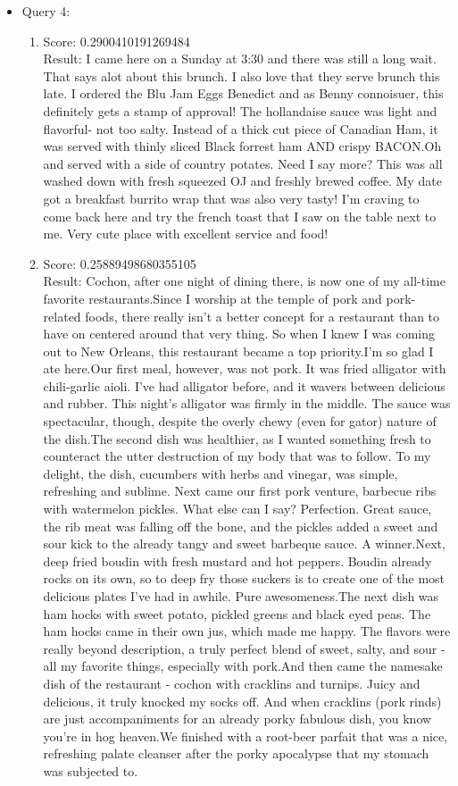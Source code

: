\documentclass[paper=a4, fontsize=11pt]{jhwhw} %
\begin{document}
\begin{itemize}
\begin{enumerate}
\end{enumerate}
\item Query 4:
\begin{enumerate}
\item Score: 0.2900410191269484\\
Result: I came here on a Sunday at 3:30 and there was still a long wait. That says alot about this brunch. I also love that they serve brunch this late. I ordered the Blu Jam Eggs Benedict and as Benny connoisuer, this definitely gets a stamp of approval! The hollandaise sauce was light and flavorful- not too salty. Instead of a thick cut piece of Canadian Ham, it was served with thinly sliced Black forrest ham AND crispy BACON.Oh and served with a side of country potates. Need I say more? This was all washed down with fresh squeezed OJ and freshly brewed coffee. My date got a breakfast burrito wrap that was also very tasty! I'm craving to come back here and try the french toast that I saw on the table next to me. Very cute place with excellent service and food!
\item Score: 0.25889498680355105\\
Result: Cochon, after one night of dining there, is now one of my all-time favorite restaurants.Since I worship at the temple of pork and pork-related foods, there really isn't a better concept for a restaurant than to have on centered around that very thing. So when I knew I was coming out to New Orleans, this restaurant became a top priority.I'm so glad I ate here.Our first meal, however, was not pork. It was fried alligator with chili-garlic aioli. I've had alligator before, and it wavers between delicious and rubber. This night's alligator was firmly in the middle. The sauce was spectacular, though, despite the overly chewy (even for gator) nature of the dish.The second dish was healthier, as I wanted something fresh to counteract the utter destruction of my body that was to follow. To my delight, the dish, cucumbers with herbs and vinegar, was simple, refreshing and sublime. Next came our first pork venture, barbecue ribs with watermelon pickles. What else can I say? Perfection. Great sauce, the rib meat was falling off the bone, and the pickles added a sweet and sour kick to the already tangy and sweet barbeque sauce. A winner.Next, deep fried boudin with fresh mustard and hot peppers. Boudin already rocks on its own, so to deep fry those suckers is to create one of the most delicious plates I've had in awhile. Pure awesomeness.The next dish was ham hocks with sweet potato, pickled greens and black eyed peas. The ham hocks came in their own jus, which made me happy. The flavors were really beyond description, a truly perfect blend of sweet, salty, and sour - all my favorite things, especially with pork.And then came the namesake dish of the restaurant - cochon with cracklins and turnips. Juicy and delicious, it truly knocked my socks off. And when cracklins (pork rinds) are just accompaniments for an already porky fabulous dish, you know you're in hog heaven.We finished with a root-beer parfait that was a nice, refreshing palate cleanser after the porky apocalypse that my stomach was subjected to.

\end{enumerate}
\end{itemize}
\end{document}
